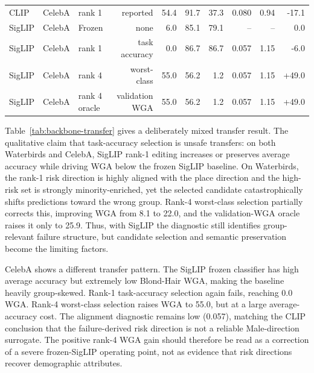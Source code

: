 \begin{table}[t]
{\begin{tabular}{@{}lllrrrrrrr@{}}
CLIP & CelebA & rank 1 & reported & 54.4 & 91.7 & 37.3 & 0.080 & 0.94 & -17.1 \\
SigLIP & CelebA & Frozen & none & 6.0 & 85.1 & 79.1 & -- & -- & 0.0 \\
SigLIP & CelebA & rank 1 & task accuracy & 0.0 & 86.7 & 86.7 & 0.057 & 1.15 & -6.0 \\
SigLIP & CelebA & rank 4 & worst-class & 55.0 & 56.2 & 1.2 & 0.057 & 1.15 & +49.0 \\
SigLIP & CelebA & rank 4 oracle & validation WGA & 55.0 & 56.2 & 1.2 & 0.057 & 1.15 & +49.0 \\
\bottomrule
\end{tabular}%
}
\end{table}

Table~\ref{tab:backbone-transfer} gives a deliberately mixed transfer result. The qualitative claim that task-accuracy selection is unsafe transfers: on both Waterbirds and CelebA, SigLIP rank-1 editing increases or preserves average accuracy while driving WGA below the frozen SigLIP baseline. On Waterbirds, the rank-1 risk direction is highly aligned with the place direction and the high-risk set is strongly minority-enriched, yet the selected candidate catastrophically shifts predictions toward the wrong group. Rank-4 worst-class selection partially corrects this, improving WGA from 8.1 to 22.0, and the validation-WGA oracle raises it only to 25.9. Thus, with SigLIP the diagnostic still identifies group-relevant failure structure, but candidate selection and semantic preservation become the limiting factors.

CelebA shows a different transfer pattern. The SigLIP frozen classifier has high average accuracy but extremely low Blond-Hair WGA, making the baseline heavily group-skewed. Rank-1 task-accuracy selection again fails, reaching 0.0 WGA. Rank-4 worst-class selection raises WGA to 55.0, but at a large average-accuracy cost. The alignment diagnostic remains low (0.057), matching the CLIP conclusion that the failure-derived risk direction is not a reliable Male-direction surrogate. The positive rank-4 WGA gain should therefore be read as a correction of a severe frozen-SigLIP operating point, not as evidence that risk directions recover demographic attributes.

